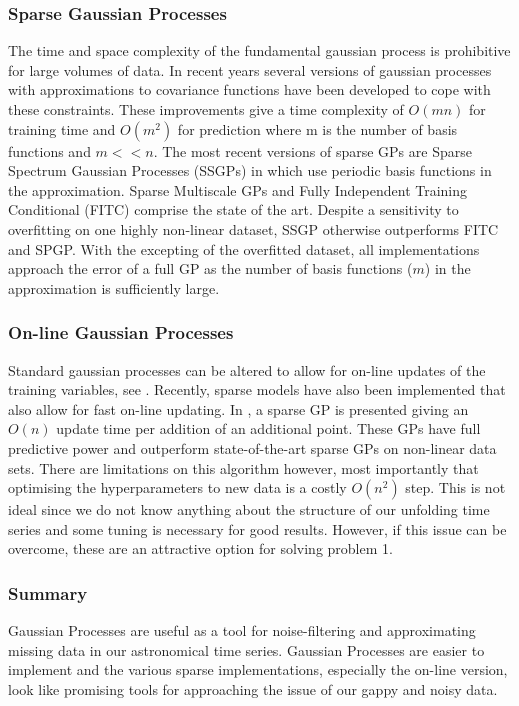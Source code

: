 \documentclass[11pt]{article}
\begin{document}
	\subsubsection{Sparse Gaussian Processes}
	The time and space complexity of the fundamental gaussian process is prohibitive for large volumes of data. In recent years several versions of gaussian processes with approximations to covariance functions have been developed to cope with these constraints. These improvements give a time complexity of $O(mn)$ for training time and $O(m^{2})$ for prediction where m is the number of basis functions and $m << n$. The most recent versions of sparse GPs are Sparse Spectrum Gaussian Processes (SSGPs) in \citep{rasmussen2010ssgpr} which use periodic basis functions in the approximation. Sparse Multiscale GPs \citep{walder2008sparse} and Fully Independent Training Conditional (FITC) \citep{snelson2005sgppi} comprise the state of the art. Despite a sensitivity to overfitting on one highly non-linear dataset, SSGP otherwise outperforms FITC and SPGP. With the excepting of the overfitted dataset, all implementations approach the error of a full GP as the number of basis functions ($m$) in the approximation is sufficiently large.

	\subsubsection{On-line Gaussian Processes}
	Standard gaussian processes can be altered to allow for on-line updates of the training variables, see \citep{osborne2007gaussian}. Recently, sparse models have also been implemented that also allow for fast on-line updating. In \citep{ranganathan2011online}, a sparse GP is presented giving an $O(n)$ update time per addition of an additional point. These GPs have full predictive power and outperform state-of-the-art sparse GPs on non-linear data sets. There are limitations on this algorithm however, most importantly that optimising the hyperparameters to new data is a costly $O(n^{2})$ step. This is not ideal since we do not know anything about the structure of our unfolding time series and some tuning is necessary for good results. However, if this issue can be overcome, these are an attractive option for solving problem 1.
	
	\subsubsection{Summary}
	Gaussian Processes are useful as a tool for noise-filtering and approximating missing data in our astronomical time series. Gaussian Processes are easier to implement and the various sparse implementations, especially the on-line version, look like promising tools for approaching the issue of our gappy and noisy data.
	
\end{document}
